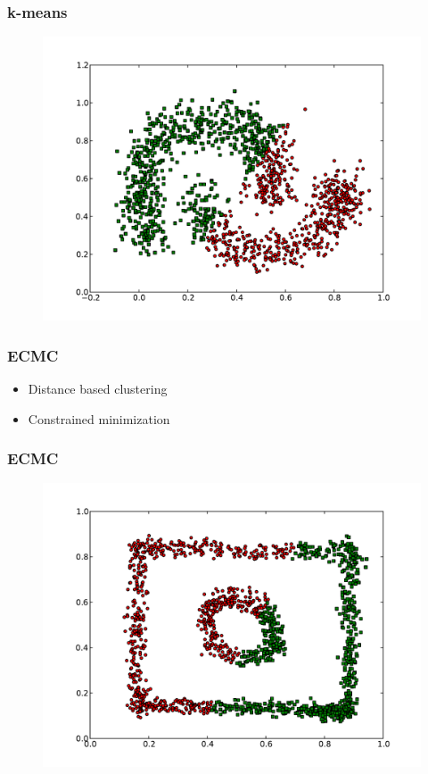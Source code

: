 \documentclass{beamer}
\begin{document}
\begin{frame}
\frametitle{k-means}
    \begin{figure}[]
    \includegraphics[scale=0.5]{kmeans_half-moons.pdf}
    \end{figure}
\end{frame}



\begin{frame}
\frametitle{ECMC}
    \begin{itemize}
	\item Distance based clustering
    	\item Constrained minimization
    \end{itemize}
\end{frame}

\begin{frame}
\frametitle{ECMC}
    \begin{figure}[]
    \includegraphics[scale=0.5]{ECMC_circle-weird.pdf}
    \end{figure}
\end{frame}
\end{document}
